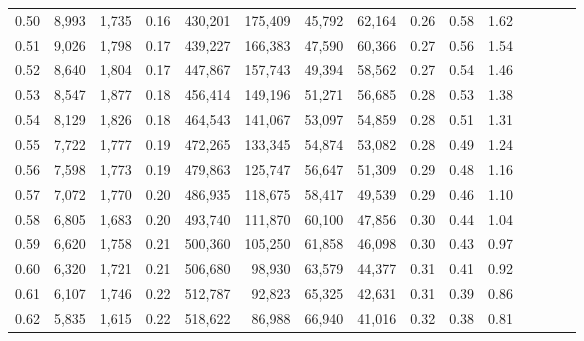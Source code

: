 \begin{tabular}{rrrcrrrrrrrrrrr}
0.50 &   8,993 &  1,735 &                                       0.16 &  430,201 &  175,409 &   45,792 &   62,164 &  0.26 &  0.58 &                         1.62 \\
0.51 &   9,026 &  1,798 &                                       0.17 &  439,227 &  166,383 &   47,590 &   60,366 &  0.27 &  0.56 &                         1.54 \\
0.52 &   8,640 &  1,804 &                                       0.17 &  447,867 &  157,743 &   49,394 &   58,562 &  0.27 &  0.54 &                         1.46 \\
0.53 &   8,547 &  1,877 &                                       0.18 &  456,414 &  149,196 &   51,271 &   56,685 &  0.28 &  0.53 &                         1.38 \\
0.54 &   8,129 &  1,826 &                                       0.18 &  464,543 &  141,067 &   53,097 &   54,859 &  0.28 &  0.51 &                         1.31 \\
0.55 &   7,722 &  1,777 &                                       0.19 &  472,265 &  133,345 &   54,874 &   53,082 &  0.28 &  0.49 &                         1.24 \\
0.56 &   7,598 &  1,773 &                                       0.19 &  479,863 &  125,747 &   56,647 &   51,309 &  0.29 &  0.48 &                         1.16 \\
0.57 &   7,072 &  1,770 &                                       0.20 &  486,935 &  118,675 &   58,417 &   49,539 &  0.29 &  0.46 &                         1.10 \\
0.58 &   6,805 &  1,683 &                                       0.20 &  493,740 &  111,870 &   60,100 &   47,856 &  0.30 &  0.44 &                         1.04 \\
0.59 &   6,620 &  1,758 &                                       0.21 &  500,360 &  105,250 &   61,858 &   46,098 &  0.30 &  0.43 &                         0.97 \\
0.60 &   6,320 &  1,721 &                                       0.21 &  506,680 &   98,930 &   63,579 &   44,377 &  0.31 &  0.41 &                         0.92 \\
0.61 &   6,107 &  1,746 &                                       0.22 &  512,787 &   92,823 &   65,325 &   42,631 &  0.31 &  0.39 &                         0.86 \\
0.62 &   5,835 &  1,615 &                                       0.22 &  518,622 &   86,988 &   66,940 &   41,016 &  0.32 &  0.38 &                         0.81 \\

\end{tabular}
